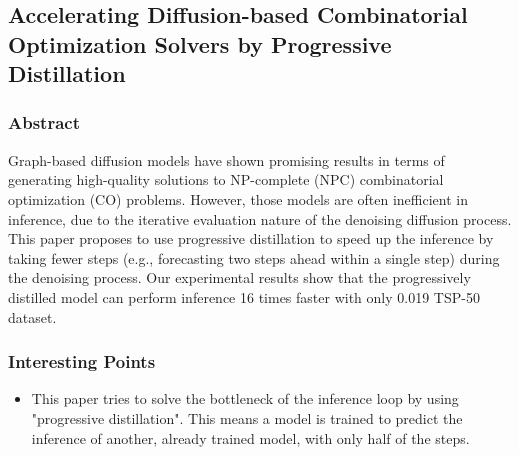 
\subsection{Accelerating Diffusion-based Combinatorial
Optimization Solvers by Progressive Distillation}
\subsubsection{Abstract}
Graph-based diffusion models have shown promising results in terms of generating
high-quality solutions to NP-complete (NPC) combinatorial optimization (CO)
problems. However, those models are often inefficient in inference, due to the
iterative evaluation nature of the denoising diffusion process. This paper proposes
to use progressive distillation to speed up the inference by taking fewer steps (e.g.,
forecasting two steps ahead within a single step) during the denoising process.
Our experimental results show that the progressively distilled model can perform
inference 16 times faster with only 0.019%
TSP-50 dataset.
\subsubsection{Interesting Points}
\begin{itemize}
    \item This paper tries to solve the bottleneck of the inference loop by using "progressive distillation". This means a model is trained to predict the inference of another, already trained model, with only half of the steps.
\end{itemize}